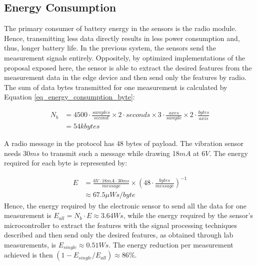 \documentclass[conference]{IEEEtran}
\begin{document}


\subsection{Energy Consumption}

The primary consumer of battery energy in the sensors is the radio module. Hence, transmitting less data directly results in less power consumption and, thus, longer battery life. In the previous system, the sensors send the measurement signals entirely. Oppositely, by optimized implementations of the proposal exposed here, the sensor is able to extract the desired features from the measurement data in the edge device and then send only the features by radio. The sum of data bytes transmitted for one measurement is calculated by Equation \ref{eq_energy_consumption_byte}:

\begin{equation}
\begin{aligned}
	N_{b} &= 4500 \cdot  \frac{samples}{second} \times 2 \cdot seconds \times 3 \cdot \frac{axes}{sample} \times 2 \cdot \frac{bytes}{axis} \\
	  &= 54 kbytes
\end{aligned}
\label{eq_energy_consumption_byte}
\end{equation}

A radio message in the protocol has 48 bytes of payload. The vibration sensor needs 30$ms$ to transmit such a message while drawing 18$mA$ at 6$V$. The energy required for each byte is represented by: 

\begin{equation}
\begin{aligned}
	E &= \frac{6V \cdot 18mA \cdot 30ms}{message} \times \left( 48 \cdot \frac{bytes}{message} \right)^{-1} \\
	  & \approx 67.5 \mu Ws/byte
\end{aligned}
\label{eq_energy_consumption_pro_byte}
\end{equation}
Hence, the energy required by the electronic sensor to send all the data for one measurement is $E_{all} = N_{b} \cdot E \approx 3.64 Ws$, while the energy required by the sensor's microcontroller to extract the features with the signal processing techniques described and then send only the desired features, as obtained through lab measurements, is $E_{single} \approx 0.51 Ws$. The energy reduction per measurement achieved is then $(1 - E_{single}/E_{all}) \approx 86\% $.
\end{document}
